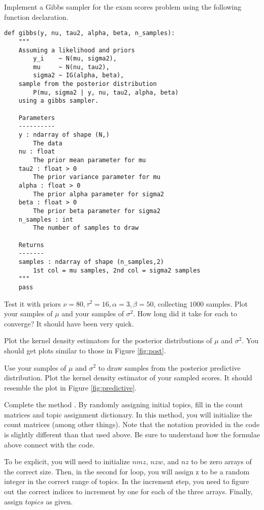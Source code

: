 
Implement a Gibbs sampler for the exam scores problem using the following function declaration.
\begin{lstlisting}
def gibbs(y, nu, tau2, alpha, beta, n_samples):
    """
    Assuming a likelihood and priors
        y_i    ~ N(mu, sigma2),
        mu     ~ N(nu, tau2),
        sigma2 ~ IG(alpha, beta),
    sample from the posterior distribution
        P(mu, sigma2 | y, nu, tau2, alpha, beta)
    using a gibbs sampler.

    Parameters
    ----------
    y : ndarray of shape (N,)
        The data
    nu : float
        The prior mean parameter for mu
    tau2 : float > 0
        The prior variance parameter for mu
    alpha : float > 0
        The prior alpha parameter for sigma2
    beta : float > 0
        The prior beta parameter for sigma2
    n_samples : int
        The number of samples to draw

    Returns
    -------
    samples : ndarray of shape (n_samples,2)
        1st col = mu samples, 2nd col = sigma2 samples
    """
    pass
\end{lstlisting}
Test it with priors $\nu=80, \tau^{2} = 16, \alpha = 3, \beta = 50$, collecting $1000$ samples. Plot your samples of $\mu$ and your samples of $\sigma^{2}$. How long did it take for each to converge? It should have been very quick.

Plot the kernel density estimators for the posterior distributions of $\mu$ and $\sigma^{2}$.
You should get plots similar to those in Figure \ref{fig:post}.

Use your samples of $\mu$ and $\sigma^{2}$ to draw samples from the posterior predictive distribution. Plot the kernel density estimator of your sampled scores.
It should resemble the plot in Figure \ref{fig:predictive}.

Complete the method . By randomly assigning initial topics, fill in the count matrices and topic assignment dictionary. In this method, you will initialize the count matrices (among other things). Note that the notation
provided in the code is slightly different than that used above. Be sure to understand how the formulae above
connect with the code.

To be explicit, you will need to initialize $nmz$, $nzw$, and $nz$ to be zero arrays of the correct size.  Then, in the second for loop, you will assign z to be a random integer in the correct range of topics.  In the increment step, you need to figure out the correct indices to increment by one for each of the three arrays.  Finally, assign $topics$ as given.

